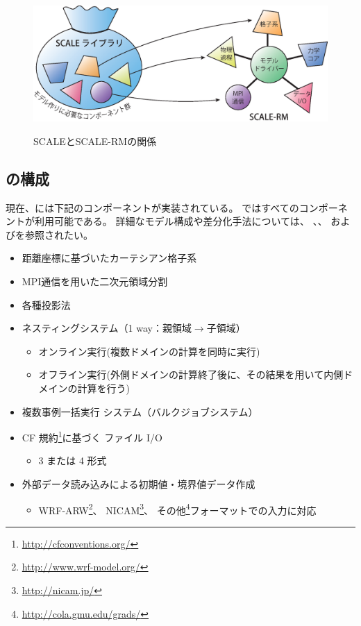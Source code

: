\begin{figure}[hbt]
\begin{center}
  \includegraphics[width=0.9\hsize]{./figure/scale.eps}\\
  \caption{SCALEとSCALE-RMの関係}
  \label{fig:scale-rm}
\end{center}
\end{figure}




\subsection{\scalerm の構成}  \label{subsec:sturcture_scale_rm}
現在、\scalerm には下記のコンポーネントが実装されている。
\scalerm ではすべてのコンポーネントが利用可能である。
詳細なモデル構成や差分化手法については、
\citet{scale_2015}、\citet{satoy_2015b}、
および\citet{nishizawa_2015}を参照されたい。\\


\begin{itemize}
 \item 距離座標に基づいたカーテシアン格子系
 \item MPI通信を用いた二次元領域分割
 \item 各種投影法
 \item ネスティングシステム（1 way：親領域$\to$子領域）
   \begin{itemize}
    \item オンライン実行(複数ドメインの計算を同時に実行)
    \item オフライン実行(外側ドメインの計算終了後に、その結果を用いて内側ドメインの計算を行う)
   \end{itemize}
 \item 複数事例一括実行 システム（バルクジョブシステム）
 \item CF 規約\footnote{\url{http://cfconventions.org/}}に基づく \netcdf ファイル I/O
   \begin{itemize}
   \item {\netcdf}3 または {\netcdf}4 形式
   \end{itemize}
 \item 外部データ読み込みによる初期値・境界値データ作成
   \begin{itemize}
    \item WRF-ARW\footnote{\url{http://www.wrf-model.org/}}、
      NICAM\footnote{\url{http://nicam.jp/}}、
      その他\grads \footnote{\url{http://cola.gmu.edu/grads/}}フォーマットでの入力に対応
   \end{itemize}
\end{itemize}

